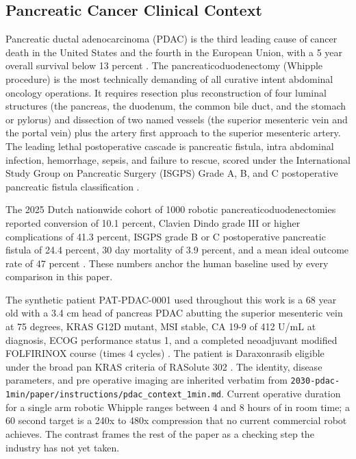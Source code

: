 \subsection{Pancreatic Cancer Clinical Context}
\label{sec:intro-pdac}

Pancreatic ductal adenocarcinoma (PDAC) is the third leading cause
of cancer death in the United States and the fourth in the
European Union, with a 5 year overall survival below 13 percent
\cite{Siegel2025CancerStatistics}. The pancreaticoduodenectomy
(Whipple procedure) is the most technically demanding of all
curative intent abdominal oncology operations. It requires
resection plus reconstruction of four luminal structures (the
pancreas, the duodenum, the common bile duct, and the stomach or
pylorus) and dissection of two named vessels (the superior
mesenteric vein and the portal vein) plus the artery first
approach to the superior mesenteric artery. The leading lethal
postoperative cascade is pancreatic fistula, intra abdominal
infection, hemorrhage, sepsis, and failure to rescue, scored under
the International Study Group on Pancreatic Surgery (ISGPS) Grade
A, B, and C postoperative pancreatic fistula classification
\cite{Bassi2017ISGPSPostOpFistula}.

The 2025 Dutch nationwide cohort of 1000 robotic
pancreaticoduodenectomies reported conversion of 10.1 percent,
Clavien Dindo grade III or higher complications of 41.3 percent,
ISGPS grade B or C postoperative pancreatic fistula of 24.4
percent, 30 day mortality of 3.9 percent, and a mean ideal outcome
rate of 47 percent \cite{DutchCohort2025Whipple}. These numbers
anchor the human baseline used by every comparison in this paper.

The synthetic patient PAT-PDAC-0001 used throughout this work is a
68 year old with a 3.4 cm head of pancreas PDAC abutting the
superior mesenteric vein at 75 degrees, KRAS G12D mutant, MSI
stable, CA 19-9 of 412 U/mL at diagnosis, ECOG performance status
1, and a completed neoadjuvant modified FOLFIRINOX course
(times 4 cycles) \cite{Conroy2018FOLFIRINOXAdjuvant}. The patient
is Daraxonrasib eligible under the broad pan KRAS criteria of
RASolute 302 \cite{rasolute302}. The identity, disease parameters,
and pre operative imaging are inherited verbatim from
\texttt{2030-pdac-1min/paper/instructions/pdac_context_1min.md}.
Current operative duration for a single arm robotic Whipple ranges
between 4 and 8 hours of in room time; a 60 second target is a
240x to 480x compression that no current commercial robot
achieves. The contrast frames the rest of the paper as a checking
step the industry has not yet taken.

